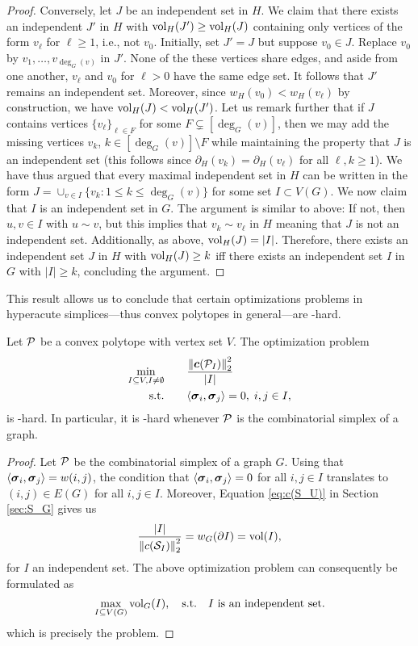 \begin{proof}
	Conversely, let $J$ be an independent set in $H$. We claim that there exists an independent $J'$ in $H$ with $\vol_H(J')\geq \vol_H(J)$ containing only vertices of the form $v_\ell$ for $\ell\geq 1$, i.e., not $v_0$. Initially, set $J'=J$ but suppose $v_0\in J$. Replace $v_0$ by $v_1,\dots,v_{\deg_G(v)}$ in $J'$.  None of the these vertices share edges, and aside from one another, $v_\ell$ and $v_0$ for $\ell>0$ have the same edge set. It follows that $J'$ remains an independent set. Moreover, since $w_H(v_0) < w_H(v_\ell)$ by construction, we have $\vol_H(J)< \vol_H(J')$. Let us remark further that if $J$ contains vertices $\{v_\ell\}_{\ell\in F}$ for some $F\subsetneq  [\deg_G(v)]$, then we may add the missing vertices $v_k$, $k\in [\deg_G(v)]\setminus F$ while maintaining the property that $J$ is an independent set (this follows since $\partial_H(v_k) = \partial_H(v_\ell)$ for all  $\ell,k\geq1$). We have thus argued that every maximal independent set in $H$ can be written in the form $J= \cup_{v\in I}\{v_k: 1\leq k\leq \deg_G(v)\}$ for some set $I\subset V(G)$. We now claim that $I$ is an independent set in $G$. The argument is similar to above: If not, then $u,v\in I$ with $u\sim v$, but this implies that $v_k\sim v_\ell$ in $H$ meaning that $J$ is not an independent set.  Additionally, as above, $\vol_H(J)=|I|$. Therefore, there exists an independent set $J$ in $H$ with $\vol_H(J)\geq k$ iff there exists an independent set $I$ in $G$ with $|I|\geq k$, concluding the argument. 
\end{proof}

This result allows us to conclude that certain optimizations problems in hyperacute simplices---thus convex polytopes in general---are \NP-hard. 

\begin{lemma}
	Let $\P$ be a convex polytope with vertex set $V$. The optimization problem 
	\begin{alignat*}{2}
	\min_{I\subset V, I\neq\emptyset} & \quad &&  \frac{\norm{\cent(\P_I)}_2^2}{|I|} \\
	\text{s.t.}&  &&  \la \sv_i,\sv_j\ra=0,\; i,j\in I,
	\end{alignat*}
	is \NP-hard. In particular, it is \NP-hard whenever $\P$ is the combinatorial simplex of a graph. 
\end{lemma}
\begin{proof}
	Let $\P$ be the combinatorial simplex of a graph $G$. Using that $\la \sv_i,\sv_j\ra = w(i,j)$, the condition that $\la \sv_i,\sv_j\ra =0$ for all $i,j\in I$ translates to $(i,j)\in E(G)$ for all $i,j\in I$. Moreover, Equation \eqref{eq:c(S_U)} in Section \ref{sec:S_G} gives us  
	\begin{align*}
	\frac{|I|}{\norm{c(\splx_I)}_2^2} = w_G(\partial I) = \vol(I),
	\end{align*}
	for $I$ an independent set. 
	The above optimization problem can consequently be formulated as 
	\[\max_{I\subset V(G)} \vol_G(I),\quad  \text{s.t.} \quad I \text{ is an independent set}.\]
	which is precisely the \vwis problem. 
	\end{proof}
	
